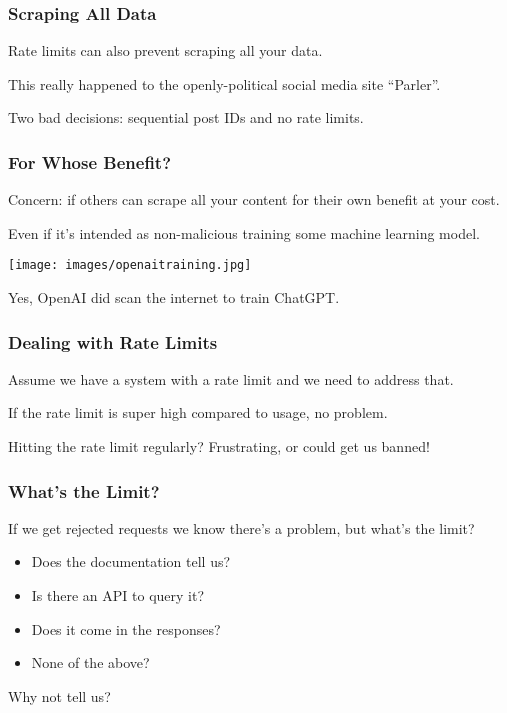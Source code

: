 \begin{frame}
\frametitle{Scraping All Data}

Rate limits can also prevent scraping all your data.

This really happened to the openly-political social media site ``Parler''.

Two bad decisions: sequential post IDs and no rate limits.

\end{frame}

\begin{frame}
\frametitle{For Whose Benefit?}

Concern: if others can scrape all your content for their own benefit at your cost.

Even if it's intended as non-malicious training some machine learning model. 

\begin{center}
  \texttt{[image: images/openaitraining.jpg]}
\end{center}

Yes, OpenAI did scan the internet to train ChatGPT.

\end{frame}

\begin{frame}
\frametitle{Dealing with Rate Limits}

Assume we have a system with a rate limit and we need to address that.

If the rate limit is super high compared to usage, no problem.

Hitting the rate limit regularly? Frustrating, or could get us banned!

\end{frame}

\begin{frame}
\frametitle{What's the Limit?}
If we get rejected requests we know there's a problem, but what's the limit?

\begin{itemize}
	\item Does the documentation tell us?
	\item Is there an API to query it?
	\item Does it come in the responses?
	\item None of the above?
\end{itemize}

Why not tell us?

\end{frame}


